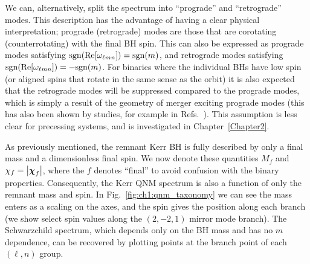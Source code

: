 We can, alternatively, split the spectrum into ``prograde'' and ``retrograde'' modes. 
This description has the advantage of having a clear physical interpretation; prograde (retrograde) modes are those that are corotating (counterrotating) with the final BH spin.
This can also be expressed as prograde modes satisfying $\mathrm{sgn}\qty(\Re[\omega_{\ell m n}]) = \mathrm{sgn}\qty(m)$, and retrograde modes satisfying $\mathrm{sgn}\qty(\Re[\omega_{\ell m n}]) = -\mathrm{sgn}\qty(m)$.
For binaries where the individual BHs have low spin (or aligned spins that rotate in the same sense as the orbit) it is also expected that the retrograde modes will be suppressed compared to the prograde modes, which is simply a result of the geometry of merger exciting prograde modes (this has also been shown by studies, for example in Refs.~\cite{Berti:2005ys, London:2014cma, JimenezForteza:2020cve}).
This assumption is less clear for precessing systems, and is investigated in Chapter~\ref{Chapter2}.

As previously mentioned, the remnant Kerr BH is fully described by only a final mass and a dimensionless final spin.
We now denote these quantities $M_f$ and $\chi_f = \abs{\vb*{\chi}_f}$, where the $f$ denotes ``final'' to avoid confusion with the binary properties.
Consequently, the Kerr QNM spectrum is also a function of only the remnant mass and spin.
In Fig.~\ref{fig:ch1:qnm_taxonomy} we can see the mass enters as a scaling on the axes, and the spin gives the position along each branch (we show select spin values along the $(2,-2,1)$ mirror mode branch).
The Schwarzchild spectrum, which depends only on the BH mass and has no $m$ dependence, can be recovered by plotting points at the branch point of each $(\ell, n)$ group.

